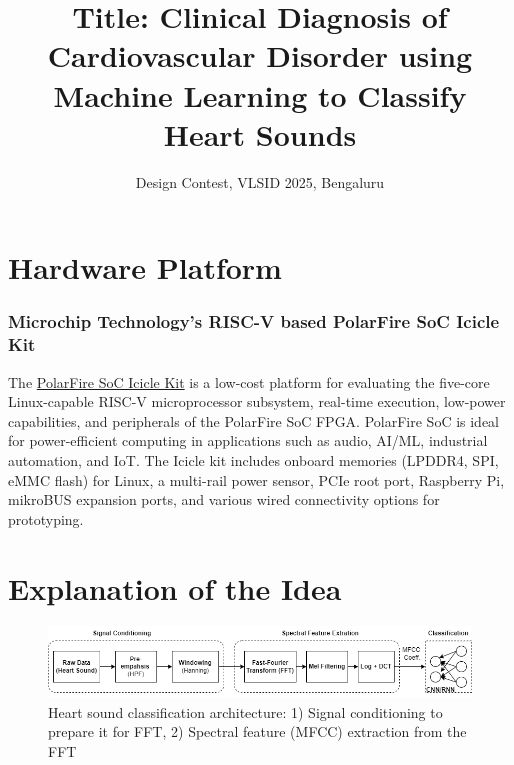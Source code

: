 \documentclass[12pt]{article}
\title{Title: Clinical Diagnosis of Cardiovascular Disorder using Machine Learning to Classify Heart Sounds }
\author{Design Contest, VLSID 2025, Bengaluru}
\begin{document}
\maketitle

\begin{abstract}

\end{abstract}

\section{Hardware Platform}

\subsubsection*{Microchip Technology’s RISC-V based PolarFire SoC Icicle Kit}

The \href{https://www.microchip.com/en-us/development-tool/mpfs-icicle-kit-es}{PolarFire SoC Icicle Kit} is a low-cost platform for evaluating the five-core Linux-capable RISC-V microprocessor subsystem, real-time execution, low-power capabilities, and peripherals of the PolarFire SoC FPGA. PolarFire SoC is ideal for power-efficient computing in applications such as audio, AI/ML, industrial automation, and IoT. The Icicle kit includes onboard memories (LPDDR4, SPI, eMMC flash) for Linux, a multi-rail power sensor, PCIe root port, Raspberry Pi, mikroBUS expansion ports, and various wired connectivity options for prototyping.


\section{Explanation of the Idea}

\begin{figure}[htbp]	
    \includegraphics[width=1.0\textwidth]{figs/HSC-arch.png}
    \caption{Heart sound classification architecture: 1) Signal conditioning to prepare it for FFT, 2) Spectral feature (MFCC) extraction from the FFT}
    \label{fig:arch-heart-sound}
\end{figure}
\end{document}
